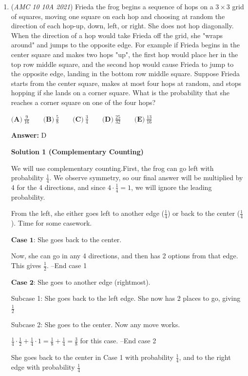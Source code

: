 \begin{enumerate}
 


	\item (\textit{AMC 10 10A 2021}) Frieda the frog begins a sequence of hops on a $3 \times 3$ grid of squares, moving one square on each hop and choosing at random the direction of each hop-up, down, left, or right. She does not hop diagonally. When the direction of a hop would take Frieda off the grid, she "wraps around" and jumps to the opposite edge. For example if Frieda begins in the center square and makes two hops "up", the first hop would place her in the top row middle square, and the second hop would cause Frieda to jump to the opposite edge, landing in the bottom row middle square. Suppose Frieda starts from the center square, makes at most four hops at random, and stops hopping if she lands on a corner square. What is the probability that she reaches a corner square on one of the four hops?


 $\textbf{(A)} ~\frac{9}{16}\qquad\textbf{(B)} ~\frac{5}{8}\qquad\textbf{(C)} ~\frac{3}{4}\qquad\textbf{(D)} ~\frac{25}{32}\qquad\textbf{(E)} ~\frac{13}{16}$

 \textbf{Answer: }D



\textbf{Solution 1 (Complementary Counting)}

We will use complementary counting.First, the frog can go left with probability $\frac14$. We observe symmetry, so our final answer will be multiplied by 4 for the 4 directions, and since $4\cdot \frac14=1$, we will ignore the leading probability.

 From the left, she either goes left to another edge ($\frac14$) or back to the center ($\frac14$). Time for some casework.

 $\textbf{Case 1:}$ She goes back to the center.

 Now, she can go in any 4 directions, and then has 2 options from that edge. This gives $\frac12$. --End case 1

 $\textbf{Case 2:}$ She goes to another edge (rightmost).

 Subcase 1: She goes back to the left edge. She now has 2 places to go, giving $\frac12$

 Subcase 2: She goes to the center. Now any move works.

 $\frac14 \cdot \frac12 + \frac14 \cdot 1=\frac18 + \frac 14=\frac38$ for this case. --End case 2

 She goes back to the center in Case 1 with probability $\frac14$, and to the right edge with probability $\frac14$


\end{enumerate}
